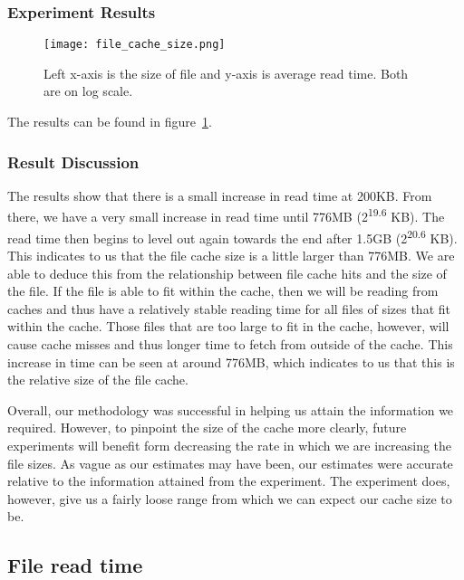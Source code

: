 \documentclass{article} %
\begin{document}
\subsubsection{Experiment Results}

\begin{figure}[!htb]
\centering
\texttt{[image: file\_cache\_size.png]}
\caption{Left x-axis is the size of file and y-axis is average read time. Both are on log scale.}
\label{fig:file_cache_size}
\end{figure}

The results can be found in figure~\ref{fig:file_cache_size}.

\subsubsection{Result Discussion}
The results show that there is a small increase in read time at 200KB. From there, we have a very small increase in read time until 776MB (2\textsuperscript{19.6} KB). The read time then begins to level out again towards the end after 1.5GB (2\textsuperscript{20.6} KB). This indicates to us that the file cache size is a little larger than 776MB. We are able to deduce this from the relationship between file cache hits and the size of the file. If the file is able to fit within the cache, then we will be reading from caches and thus have a relatively stable reading time for all files of sizes that fit within the cache. Those files that are too large to fit in the cache, however, will cause cache misses and thus longer time to fetch from outside of the cache. This increase in time can be seen at around 776MB, which indicates to us that this is the relative size of the file cache. 

Overall, our methodology was successful in helping us attain the information we required. However, to pinpoint the size of the cache more clearly, future experiments will benefit form decreasing the rate in which we are increasing the file sizes. As vague as our estimates may have been, our estimates were accurate relative to the information attained from the experiment. The experiment does, however, give us a fairly loose range from which we can expect our cache size to be.

\subsection{File read time}
\end{document}
